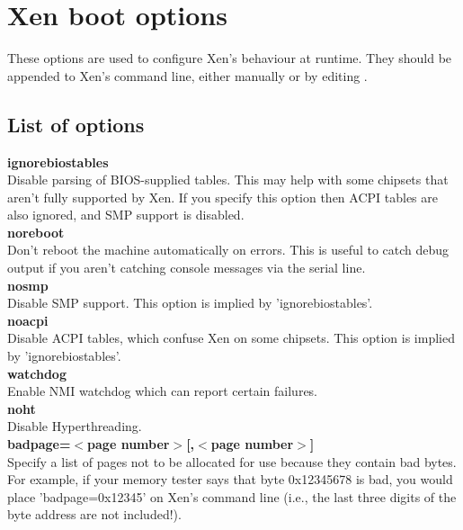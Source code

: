 \documentclass[11pt,twoside,final,openright]{xenstyle}
\begin{document}
{\chapter{Xen boot options}

These options are used to configure Xen's behaviour at runtime.  They
should be appended to Xen's command line, either manually or by
editing .

\section{List of options}

{\bf ignorebiostables }\\
 Disable parsing of BIOS-supplied tables. This may help with some
 chipsets that aren't fully supported by Xen. If you specify this
 option then ACPI tables are also ignored, and SMP support is
 disabled. \\

{\bf noreboot } \\
 Don't reboot the machine automatically on errors.  This is
 useful to catch debug output if you aren't catching console messages
 via the serial line. \\

{\bf nosmp } \\
 Disable SMP support.
 This option is implied by 'ignorebiostables'. \\

{\bf noacpi } \\
 Disable ACPI tables, which confuse Xen on some chipsets.
 This option is implied by 'ignorebiostables'. \\

{\bf watchdog } \\
 Enable NMI watchdog which can report certain failures. \\

{\bf noht } \\
 Disable Hyperthreading. \\

{\bf badpage=$<$page number$>$[,$<$page number$>$] } \\
                  Specify a list of pages not to be allocated for use 
                  because they contain bad bytes. For example, if your
                  memory tester says that byte 0x12345678 is bad, you would
                  place 'badpage=0x12345' on Xen's command line (i.e., the
                  last three digits of the byte address are not
                  included!). \\

}
\end{document}
